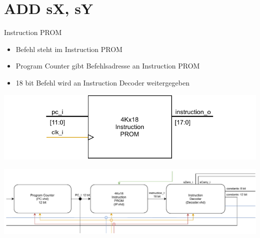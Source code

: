 \documentclass[10pt, t,
aspectratio=169,%
usenames,
dvipsnames,
]{beamer}
\begin{document}
	\section{ADD sX, sY}
	\begin{frame}{Instruction PROM}
		\begin{multicols}{2}
		\begin{itemize}
			\item Befehl steht im Instruction PROM
			\item Program Counter gibt Befehlsadresse an Instruction PROM
			\item 18 bit Befehl wird an Instruction Decoder weitergegeben
		\end{itemize}
		\includegraphics[width=\linewidth]{../Blockbeschreibungen/IP_beschreibung.pdf}
		\end{multicols}
		\includegraphics[width=\linewidth]{../Blockbeschreibungen/PC-IDBlockdiagramSnipits.pdf}
	\end{frame}
\end{document}
